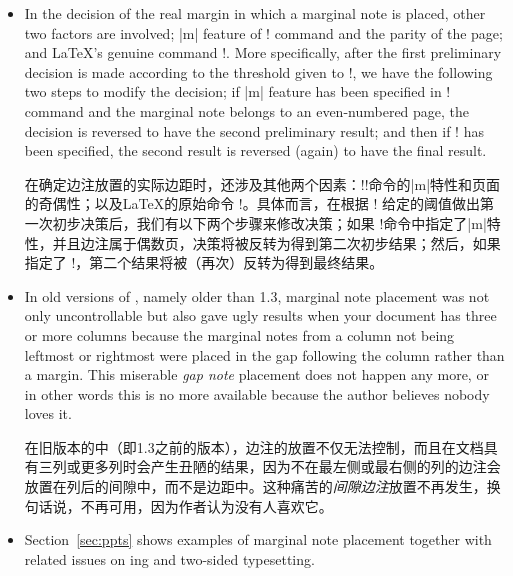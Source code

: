 \begin{description}
\begin{itemize}
上述设置$k=0$或$k=100$使得边注从不同的列共享一个侧边距，当一个（并列）页面有三个或更多列时，共享是不可避免的。当一个侧边距被来自两个或更多列的边注共享时，可能会发生两个来自不同列的边注在它们各自要占据的空间上发生冲突的情况。这个冲突通过\Paracol{}来解决，它会将后面给出的边注推到更低的位置，直到找到一个可用的空间为止。请注意，要被推到下方的边注是由源代码中的位置决定的，而不是打印结果中的位置。同时，请注意\Paracol{}利用已经放置的两个边注之间的空间，在后面的边注放置时尽可能地在自然位置上放置，或者尽量减少推下的量。
\item
In the decision of the real margin in which a marginal note is placed,
other two factors are involved;  |m| feature of \!\twosided! command and
the parity of the page; and \LaTeX's genuine command \!\reversemarginpar!.
More specifically, after the first preliminary decision is made according
to the threshold given to \!\marginparthreshold!, we have the following
two steps to modify the decision;  if |m| feature has been specified in
\!\twosided! command and the marginal note belongs to an even-numbered
page, the decision is reversed to have the second preliminary result;  and
then if \!\reversemarginpar! has been specified, the second result is
reversed (again) to have the final result.

在确定边注放置的实际边距时，还涉及其他两个因素：!\twosided!命令的|m|特性和页面的奇偶性；以及\LaTeX 的原始命令 \!\reversemarginpar!。具体而言，在根据 \!\marginparthreshold! 给定的阈值做出第一次初步决策后，我们有以下两个步骤来修改决策；如果 \!\twosided!命令中指定了|m|特性，并且边注属于偶数页，决策将被反转为得到第二次初步结果；然后，如果指定了 \!\reversemarginpar!，第二个结果将被（再次）反转为得到最终结果。
\item
In old versions of \Paracol, namely older than 1.3, marginal note
placement was not only uncontrollable but also gave ugly results when your
document has three or more columns because the marginal notes from a column
not being leftmost or rightmost were placed in the gap following the
column rather than a margin.  This miserable {\em gap note} placement does
not happen any more, or in other words this is no more available because
the author believes nobody loves it.

在旧版本的\Paracol 中（即1.3之前的版本），边注的放置不仅无法控制，而且在文档具有三列或更多列时会产生丑陋的结果，因为不在最左侧或最右侧的列的边注会放置在列后的间隙中，而不是边距中。这种痛苦的{\em 间隙边注}放置不再发生，换句话说，不再可用，因为作者认为没有人喜欢它。
\item
Section~\ref{sec:ppts} shows examples of marginal note placement together
with related issues on \parapag{}ing and two-sided typesetting.


\end{itemize}
\end{description}
